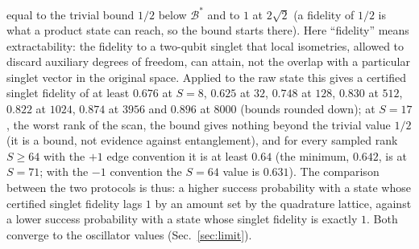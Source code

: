 \documentclass[11pt,a4paper]{article}
\begin{document}
equal to the trivial bound $1/2$ below $\mathcal B^*$ and to $1$ at $2\sqrt2$ (a fidelity of $1/2$ is what a product state can reach, so the bound starts there). Here ``fidelity'' means extractability: the fidelity to a two-qubit singlet that local isometries, allowed to discard auxiliary degrees of freedom, can attain, not the overlap with a particular singlet vector in the original space. Applied to the raw state this gives a certified singlet fidelity of at least $0.676$ at $S=8$, $0.625$ at $32$, $0.748$ at $128$, $0.830$ at $512$, $0.822$ at $1024$, $0.874$ at $3956$ and $0.896$ at $8000$ (bounds rounded down); at $S=17$, the worst rank of the scan, the bound gives nothing beyond the trivial value $1/2$ (it is a bound, not evidence against entanglement), and for every sampled rank $S\ge64$ with the $+1$ edge convention it is at least $0.64$ (the minimum, $0.642$, is at $S=71$; with the $-1$ convention the $S=64$ value is $0.631$). The comparison between the two protocols is thus: a higher success probability with a state whose certified singlet fidelity lags $1$ by an amount set by the quadrature lattice, against a lower success probability with a state whose singlet fidelity is exactly $1$. Both converge to the oscillator values (Sec.~\ref{sec:limit}).
\end{document}
